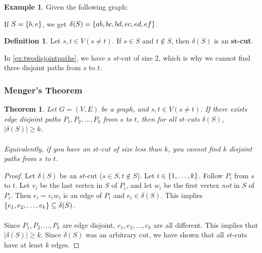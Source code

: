 \documentclass[]{article}
\newtheorem*{theorem}{Theorem}
\theoremstyle{definition}
\newtheorem*{defn}{Definition}
\newtheorem{ex}{Example}[section]
\DeclarePairedDelimiter{\set}{\lbrace}{\rbrace}
\begin{document}
			\begin{ex}
				Given the following graph:
				\begin{center}
				\end{center}

				If $S = \set{b, e}$, we get $\delta(S) = \set{ab, bc, bd, ec, ed, ef}$.
			\end{ex}

			\begin{defn}
				Let $s, t \in V (s \ne t)$. If $s \in S$ and $t \not \in S$, then $\delta(S)$ is an \textbf{$\mathbf{st}$-cut}.
			\end{defn}

			In \ref{ex:twodisjointpaths}, we have a $st$-cut of size 2, which is why we cannot find three disjoint paths from $s$ to $t$.

			\subsubsection{Menger's Theorem}
				\begin{theorem}
					Let $G = (V, E)$ be a graph, and $s, t \in V (s \ne t)$. If there exists edge disjoint paths $P_1, P_2, \ldots, P_k$ from $s$ to $t$, then for all $st$-cuts $\delta(S)$, $|\delta(S)| \ge k$.
					\\ \\
					Equivalently, if you have an $st$-cut of size less than $k$, you cannot find $k$ disjoint paths from $s$ to $t$.
				\end{theorem}

				\begin{proof}
					Let $\delta(S)$ be an $st$-cut ($s \in S, t \not \in S$). Let $i \in \set{1, \ldots, k}$. Follow $P_i$ from $s$ to $t$. Let $v_i$ be the last vertex in $S$ of $P_i$, and let $w_i$ be the first vertex \emph{not} in $S$ of $P_i$. Then $e_i = v_i w_i$ is an edge of $P_i$ and $e_i \in \delta(S)$. This implies $\set{e_1, e_2, \ldots, e_k} \subseteq \delta(S)$.
					\\ \\
					Since $P_1, P_2, \ldots, P_k$ are edge disjoint, $e_1, e_2, \ldots, e_k$ are all different. This implies that $|\delta(S)| \ge k$. Since $\delta(S)$ was an arbitrary cut, we have shown that all $st$-cuts have at least $k$ edges.
				\end{proof}
\end{document}
